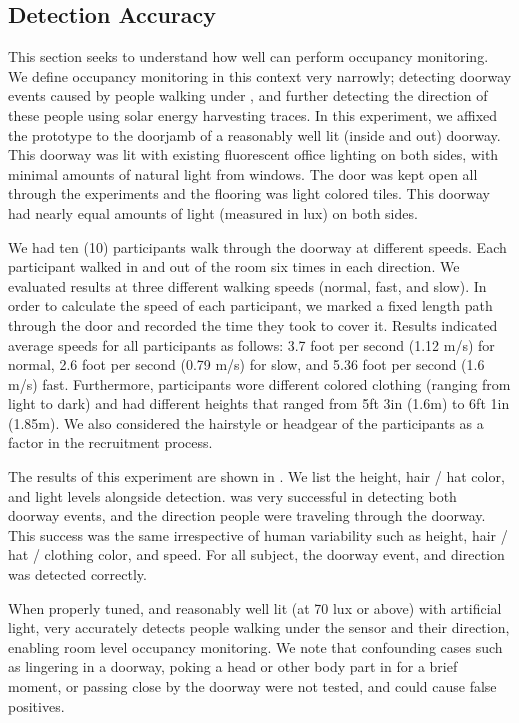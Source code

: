 \subsection{Detection Accuracy}
This section seeks to understand how well \sysname can perform occupancy monitoring.
We define occupancy monitoring in this context very narrowly; detecting doorway events caused by people walking under \sysname, and further detecting the direction of these people using solar energy harvesting traces. 
In this experiment, we affixed the \sysname prototype to the doorjamb of a reasonably well lit (inside and out) doorway.
This doorway was lit with existing fluorescent  office lighting on both sides, with minimal amounts of natural light from windows.
The door was kept open all through the experiments and the flooring was light colored tiles.
This doorway had nearly equal amounts of light (measured in lux) on both sides.

We had ten (10) participants walk through the doorway at different speeds. 
Each participant walked in and out of the room six times in each direction. 
We evaluated results at three different walking speeds (normal, fast, and slow). 
In order to calculate the speed of each participant, we marked a fixed length path through the door and recorded the time they took to cover it. 
Results indicated average speeds for all participants as follows:  3.7 foot per second (1.12 m/s) for normal, 2.6 foot per second (0.79 m/s) for slow, and 5.36 foot per second (1.6 m/s) fast. 
Furthermore, participants wore different colored clothing (ranging from light to dark) and had different heights that ranged from 5ft 3in (1.6m) to 6ft 1in (1.85m). 
We also considered the hairstyle or headgear of the participants as a factor in the recruitment process.

The results of this experiment are shown in .
We list the height, hair / hat color, and light levels alongside detection. 
\sysname was very successful in detecting both doorway events, and the direction people were traveling through the doorway.
This success was the same irrespective of human variability such as height, hair / hat / clothing color, and speed.
For all subject, the doorway event, and direction was detected correctly.

 When properly tuned, and reasonably well lit (at 70 lux or above) with artificial light, \sysname very accurately detects people walking under the sensor and their direction, enabling room level occupancy monitoring.
We note that confounding cases such as lingering in a doorway, poking a head or other body part in for a brief moment, or passing close by the doorway were not tested, and could cause false positives.


